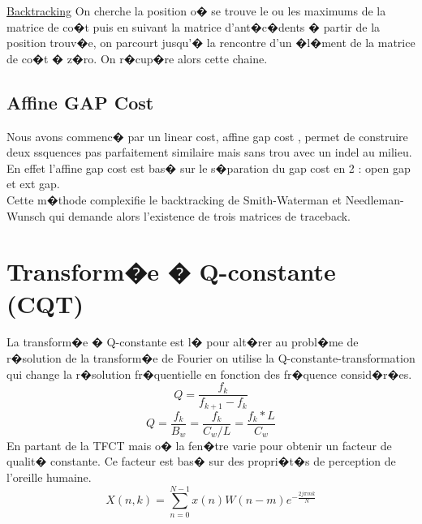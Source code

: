 \documentclass[12pt]{article}
\begin{document}
\underline{Backtracking} On cherche la position o� se trouve le ou les maximums de la matrice de co�t puis en suivant la matrice d'ant�c�dents � partir de la position trouv�e, on parcourt jusqu'� la rencontre d'un �l�ment de la matrice de co�t � z�ro. On r�cup�re alors cette chaine. 


\subsection{Affine GAP Cost}
Nous avons commenc� par un linear cost, affine gap cost , permet de construire deux ssquences pas parfaitement similaire mais sans trou avec un indel au milieu.\\
En effet l'affine gap cost est bas� sur le s�paration du gap cost en 2 : open gap et ext gap.\\
Cette m�thode complexifie le backtracking de Smith-Waterman et Needleman-Wunsch qui demande alors l'existence de trois matrices de traceback.

\section{Transform�e � Q-constante (CQT)}
La transform�e � Q-constante est l� pour alt�rer au probl�me de r�solution de la transform�e de Fourier on utilise la Q-constante-transformation qui change la r�solution fr�quentielle en fonction des fr�quence consid�r�es.
\begin{equation*}
Q= \frac{f_{k}}{f_{k+1}-f_{k}} 
\end{equation*}
\begin{equation*}
Q =\frac{f_{k}}{B_{w}} = \frac{f_{k}}{C_{w}/L} = \frac{f_{k}*L}{C_{w}}
\end{equation*}
En partant de la TFCT mais o� la fen�tre varie pour obtenir un facteur de qualit� constante. Ce facteur est bas� sur des propri�t�s de perception de l'oreille humaine.
\begin{equation*}
X(n,k) = \sum_{n=0}^{N-1}x(n)W(n-m) e^{- \frac{2j\pi m k}{N}}
\end{equation*}
\end{document}
